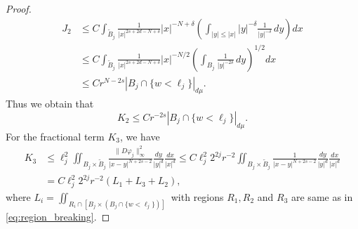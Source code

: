 \documentclass[11pt]{article}
\begin{document}
\begin{proof}
\begin{align*}
J_2 
&\leq C \int_{\widetilde{B}_j} \frac{1}{|x|^{2 s  + 2 d - N + \delta}}   |x|^{-N + \delta} 
\left( \int_{|y| \leq |x|} |y|^{-\delta}   \frac{1}{|y|^{-\delta}} \, dy \right) dx\\
&\leq C \int_{\widetilde{B}_j} \frac{1}{|x|^{2 s  + 2 d - N + \delta}}   |x|^{-N/2}
\left( \int_{B_j} \frac{1}{|y|^{-2\delta}} \, dy \right)^{1/2} dx\\
&\leq C   r^{N - 2s}   \left| B_j \cap \{ w < \ell_j \} \right|_{d\mu}.
\end{align*}
Thus we obtain that
\begin{equation*}
K_2
\leq C   r^{ - 2s}   \left| B_j \cap \{ w < \ell_j \} \right|_{d\mu}.
\end{equation*}
For the fractional term $K_3$, we have
\begin{align*} 
K_3 &
\leq  \ell_j^2 \iint_{B_j \times \widetilde{B}_j} 
\frac{\| D\varphi_j \|^2_\infty}{|x - y|^{N + 2s-2}} 
\frac{dy}{|y|^{d}}   \frac{dx}{|x|^{d}}
\leq C \ell_j^2 2^{2j} r^{-2} 
\iint_{B_j \times \widetilde{B}_j} 
\frac{1}{|x - y|^{N + 2s-2}} 
  \frac{dy}{|y|^{d}}   \frac{dx}{|x|^{d}} \\
&= C \ell_j^2 2^{2j} r^{-2} \left( L_1 + L_3 + L_2 \right),
\end{align*}
where $L_i = \iint_{R_i \cap [B_j \times (B_j \cap \{ w < \ell_j \})]}$ with regions $R_1, R_2$ and $R_3$ are same as in \eqref{eq:region_breaking}.


\end{proof}
\end{document}

